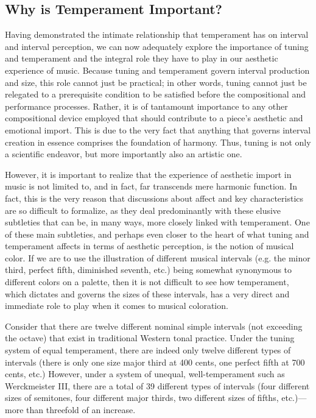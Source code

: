\subsection{Why is Temperament
Important?}\label{why-is-temperament-important}

Having demonstrated the intimate relationship that temperament has on
interval and interval perception, we can now adequately explore the
importance of tuning and temperament and the integral role they have to
play in our aesthetic experience of music. Because tuning and
temperament govern interval production and size, this role cannot just
be practical; in other words, tuning cannot just be relegated to a
prerequisite condition to be satisfied before the compositional and
performance processes. Rather, it is of tantamount importance to any
other compositional device employed that should contribute to a piece's
aesthetic and emotional import. This is due to the very fact that
anything that governs interval creation in essence comprises the
foundation of harmony. Thus, tuning is not only a scientific endeavor,
but more importantly also an artistic one.

However, it is important to realize that the experience of aesthetic
import in music is not limited to, and in fact, far transcends mere
harmonic function. In fact, this is the very reason that discussions
about affect and key characteristics are so difficult to formalize, as
they deal predominantly with these elusive subtleties that can be, in
many ways, more closely linked with temperament. One of these main
subtleties, and perhaps even closer to the heart of what tuning and
temperament affects in terms of aesthetic perception, is the notion of
musical color. If we are to use the illustration of different musical
intervals (e.g. the minor third, perfect fifth, diminished seventh,
etc.) being somewhat synonymous to different colors on a palette, then
it is not difficult to see how temperament, which dictates and governs
the sizes of these intervals, has a very direct and immediate role to
play when it comes to musical coloration.

Consider that there are twelve different nominal simple intervals (not
exceeding the octave) that exist in traditional Western tonal practice.
Under the tuning system of equal temperament, there are indeed only
twelve different types of intervals (there is only one size major third
at 400 cents, one perfect fifth at 700 cents, etc.) However, under a
system of unequal, well-temperament such as Werckmeister III, there are
a total of 39 different types of intervals (four different sizes of
semitones, four different major thirds, two different sizes of fifths,
etc.)---more than threefold of an increase.


